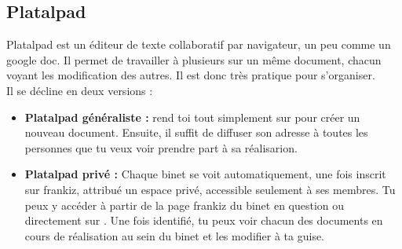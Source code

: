\subsection{Platalpad}
\label{platalpad}

Platalpad est un éditeur de texte collaboratif par navigateur, un peu comme un google doc. Il permet de travailler à plusieurs sur un même document, chacun voyant les modification des autres. Il est donc très pratique pour s'organiser.\\
Il se décline en deux versions :
\begin{itemize}

\item \textbf{Platalpad généraliste :} rend toi tout simplement sur  pour créer un nouveau document. Ensuite, il suffit de diffuser son adresse à toutes les personnes que tu veux voir prendre part à sa réalisarion. \\

\item \textbf{Platalpad privé :} Chaque binet se voit automatiquement, une fois inscrit sur frankiz, attribué un espace privé, accessible seulement à ses membres. Tu peux y accéder à partir de la page frankiz du binet en question ou directement sur . Une fois identifié, tu peux voir chacun des documents en cours de réalisation au sein du binet et les modifier à ta guise.

\end{itemize}




